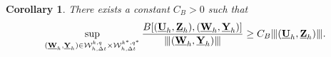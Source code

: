 \documentclass[sn-mathphys-num]{sn-jnl}
\newtheorem{cor}[thm]{Corollary}
\numberwithin{equation}{section}
\newcommand{\tnorm}[1]{\vert\hspace{-0.3mm}\Vert#1\Vert\hspace{-0.3mm}\vert}
\newcommand{\ProdFullyDiscrSpace}[2]{ \mathcal{W}^{ {#1},{#2}}_{h, \Delta t  } }
\newcommand{\Uh}{\underline{\mathbf{U}}_h}
\newcommand{\Yh}{\underline{\mathbf{Y}}_h}
\newcommand{\Zh}{\underline{\mathbf{Z}}_h}
\newcommand{\Wh}{\underline{\mathbf{W}}_h}
\begin{document}
\begin{cor}
    There exists a constant $C_B>0$ such that 
    \begin{equation}
        \sup_{(\Wh,\Yh) \in \ProdFullyDiscrSpace{k}{q} \times \ProdFullyDiscrSpace{k^\ast}{q^\ast}} \frac{B[(\Uh,\Zh),(\Wh,\Yh)]}{\tnorm{(\Wh,\Yh)}} \ge C_B \tnorm{(\Uh,\Zh)}.
    \end{equation}
\end{cor}

\end{document}
